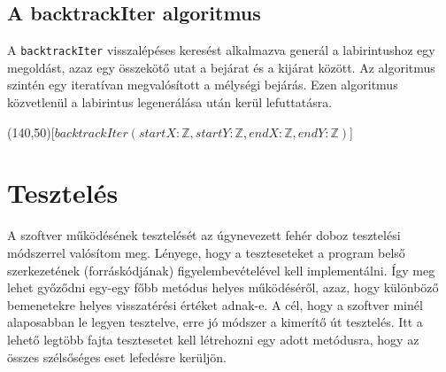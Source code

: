 \newpage

\subsection{A backtrackIter algoritmus}

A \verb|backtrackIter| visszalépéses keresést alkalmazva generál a labirintushoz egy megoldást, azaz egy összekötő utat a bejárat és a kijárat között. Az algoritmus szintén egy iteratívan megvalósított a mélységi bejárás. Ezen algoritmus közvetlenül a labirintus legenerálása után kerül lefuttatásra.

\vspace{5mm}

\begin{struktogramm}(140,50)[\(backtrackIter(startX: \mathbb{Z}, startY: \mathbb{Z}, endX: \mathbb{Z}, endY: \mathbb{Z})\)]
		\whileend
	\whileend
		\change
		\ifend
	\whileend
\end{struktogramm}

\newpage

\section{Tesztelés}

A szoftver működésének tesztelését az úgynevezett fehér doboz tesztelési módszerrel valósítom meg. Lényege, hogy a teszteseteket a program belső szerkezetének (forráskódjának) figyelembevételével kell implementálni. Így meg lehet győződni egy-egy főbb metódus helyes működéséről, azaz, hogy különböző bemenetekre helyes visszatérési értéket adnak-e. A cél, hogy a szoftver minél alaposabban le legyen tesztelve, erre jó módszer a kimerítő út tesztelés. Itt a lehető legtöbb fajta tesztesetet kell létrehozni egy adott metódusra, hogy az összes szélsőséges eset lefedésre kerüljön.

